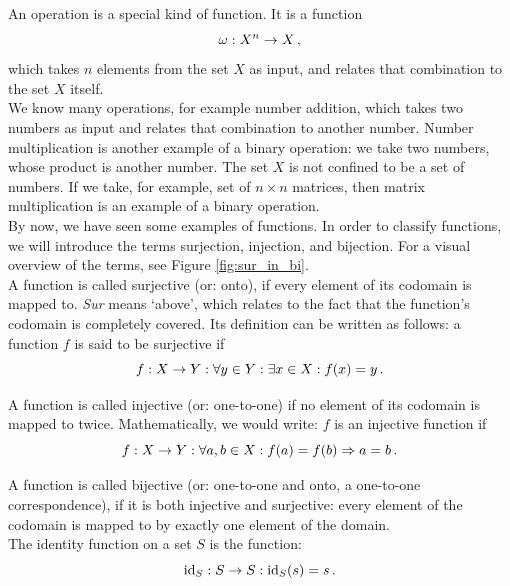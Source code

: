     An operation is a special kind of function. It is a function
    \begin{equation}
        \omega: X^n \rightarrow X \thinspace ,
    \end{equation}
    which takes $n$ elements from the set $X$ as input, and relates that combination to the set $X$ itself. \\

    We know many operations, for example number addition, which takes two numbers as input and relates that combination to another number. Number multiplication is another example of a binary operation: we take two numbers, whose product is another number. The set $X$ is not confined to be a set of numbers. If we take, for example, set of $n \times n$ matrices, then matrix multiplication is an example of a binary operation. \\

    By now, we have seen some examples of functions. In order to classify functions, we will introduce the terms surjection, injection, and bijection. For a visual overview of the terms, see Figure \ref{fig:sur_in_bi}. \\

    A function is called surjective (or: onto), if every element of its codomain is mapped to. \emph{Sur} means `above', which relates to the fact that the function's codomain is completely covered. Its definition can be written as follows: a function $f$ is said to be surjective if
    \begin{equation}
        f: X \rightarrow Y: \forall y \in Y: \exists x \in X: f(x) = y \thinspace .
    \end{equation}

    A function is called injective (or: one-to-one) if no element of its codomain is mapped to twice. Mathematically, we would write: $f$ is an injective function if
    \begin{equation}
        f: X \rightarrow Y: \forall a, b \in X: f(a) = f(b) \Rightarrow a = b \thinspace .
    \end{equation}

    A function is called bijective (or: one-to-one and onto, a one-to-one correspondence), if it is both injective and surjective: every element of the codomain is mapped to by exactly one element of the domain. \\

    The identity function on a set $S$ is the function:
    \begin{equation}
        \operatorname{id}_S: S \rightarrow S: \operatorname{id}_S(s) = s \thinspace .
    \end{equation}

